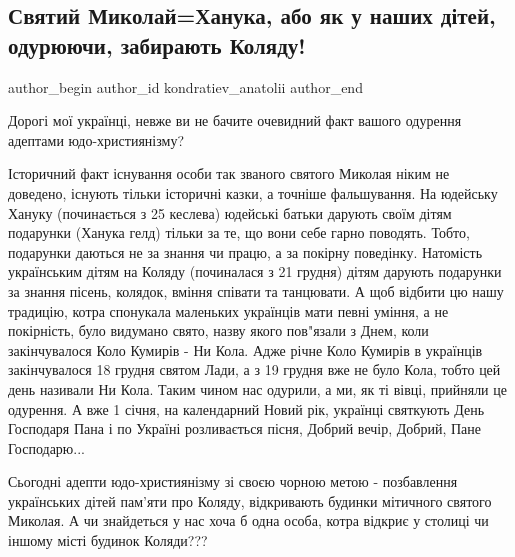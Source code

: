  
 
 
 
 

\subsection{Святий Миколай=Ханука, або як у наших дітей, одурюючи, забирають Коляду!}

\ifcmt
  author_begin
   author_id kondratiev_anatolii
  author_end
\fi


Дорогі мої українці, невже ви не бачите очевидний факт вашого одурення адептами
юдо-християнізму? 

Історичний факт існування особи так званого святого Миколая ніким не доведено,
існують тільки історичні казки, а точніше фальшування. На юдейську Хануку
(починається з 25 кеслева) юдейські батьки дарують своїм дітям подарунки
(Ханука гелд) тільки за те, що вони себе гарно поводять. Тобто, подарунки
даються не за знання чи працю, а за покірну поведінку. Натомість українським
дітям на Коляду (починалася з 21 грудня) дітям дарують подарунки за знання
пісень, колядок, вміння співати та танцювати. А щоб відбити цю нашу традицію,
котра спонукала маленьких українців мати певні уміння, а не покірність, було
видумано свято, назву якого пов"язали з Днем, коли закінчувалося Коло Кумирів -
Ни Кола. Адже річне Коло Кумирів в українців закінчувалося 18 грудня святом
Лади, а з 19 грудня вже не було Кола, тобто цей день називали Ни Кола. Таким
чином нас одурили, а ми, як ті вівці, прийняли це одурення. А вже 1 січня, на
календарний Новий рік, українці святкують День Господаря Пана і по Україні
розливається пісня, Добрий вечір, Добрий, Пане Господарю...

Сьогодні адепти юдо-християнізму зі своєю чорною метою - позбавлення українських
дітей пам'яти про Коляду, відкривають будинки мітичного святого Миколая. А чи
знайдеться у нас хоча б одна особа, котра відкриє у столиці чи іншому місті
будинок Коляди???
